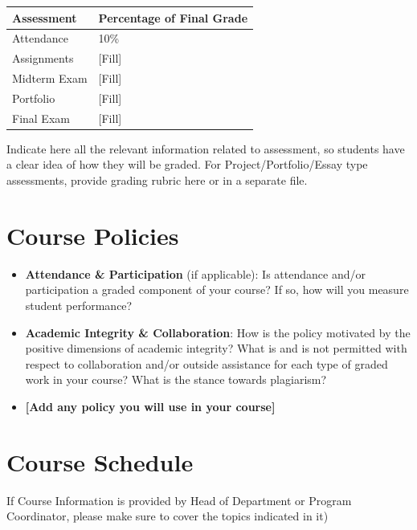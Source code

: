 \documentclass[12pt]{article}
\begin{document}
\begin{table}[htbp]
\centering
\begin{tabular}{@{}p{}|p{}@{}}
\textbf{Assessment} & \textbf{Percentage of Final Grade} \\
\midrule
Attendance & 10\% \\
\midrule
Assignments & [Fill] \\
\midrule
Midterm Exam & [Fill] \\
\midrule
Portfolio & [Fill] \\
\midrule
Final Exam & [Fill] \\
\bottomrule
\end{tabular}
\end{table}

Indicate here all the relevant information related to assessment, so students have a clear idea of how they will be graded. For Project/Portfolio/Essay type assessments, provide grading rubric here or in a separate file.

\section{Course Policies}

\begin{itemize}
\item \textbf{Attendance \& Participation} (if applicable): Is attendance and/or participation a graded component of your course? If so, how will you measure student performance?

\item \textbf{Academic Integrity \& Collaboration}: How is the policy motivated by the positive dimensions of academic integrity? What is and is not permitted with respect to collaboration and/or outside assistance for each type of graded work in your course? What is the stance towards plagiarism?

\item \textbf{[Add any policy you will use in your course]}
\end{itemize}

\section{Course Schedule}

If Course Information is provided by Head of Department or Program Coordinator, please make sure to cover the topics indicated in it)
\end{document}
